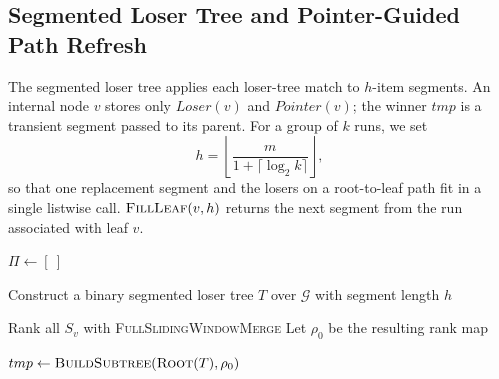 \subsection{Segmented Loser Tree and Pointer-Guided Path Refresh}
\label{sec:appendix-segment-algorithm}

The segmented loser tree applies each loser-tree match to $h$-item
segments.  An internal node $v$ stores only
$\mathit{Loser}(v)$ and $\mathit{Pointer}(v)$; the winner $tmp$ is a
transient segment passed to its parent.  For a group of $k$ runs, we set
\begin{equation}
  h=\left\lfloor
    \frac{m}{1+\lceil\log_2 k\rceil}
  \right\rfloor,
  \label{eq:segment-length}
\end{equation}
so that one replacement segment and the losers on a root-to-leaf path
fit in a single listwise call.  $\textsc{FillLeaf}(v,h)$ returns the next
segment from the run associated with leaf $v$.

\begin{algorithm}[t]
\small
\caption{Segmented Loser Tree Merge}
\label{alg:segmented_loser_tree_merge}

$\Pi\gets[\ ]$\;

Construct a binary segmented loser tree $T$ over $\mathcal G$
with segment length $h$\;

\;
Rank all $S_v$ with \textsc{FullSlidingWindowMerge}\;
Let $\rho_0$ be the resulting rank map\;

\;

\;
$tmp\gets\textsc{BuildSubtree}(\textsc{Root}(T),\rho_0)$\;
\Return{$\Pi$}\;
\end{algorithm}

